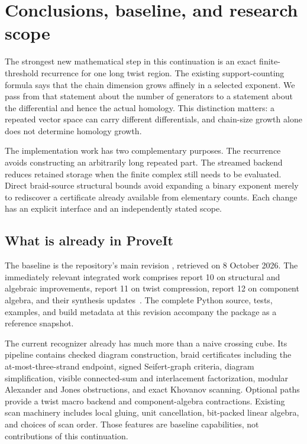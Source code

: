 \section{Conclusions, baseline, and research scope}\label{sec:scope}

The strongest new mathematical step in this continuation is an exact
finite-threshold recurrence for one long twist region. The existing
support-counting formula says that the chain dimension grows affinely in a
selected exponent. We pass from that statement about the number of
generators to a statement about the differential and hence the actual
homology. This distinction matters: a repeated vector space can carry
different differentials, and chain-size growth alone does not determine
homology growth.

The implementation work has two complementary purposes. The recurrence
avoids constructing an arbitrarily long repeated part. The streamed backend
reduces retained storage when the finite complex still needs to be evaluated.
Direct braid-source structural bounds avoid expanding a binary exponent
merely to rediscover a certificate already available from elementary counts.
Each change has an explicit interface and an independently stated scope.

\subsection{What is already in ProveIt}

The baseline is the repository's main revision
, retrieved on 8 October 2026.
The immediately relevant integrated work comprises report 10 on structural
and algebraic improvements, report 11 on twist compression, report 12 on
component algebra, and their synthesis updates~\cite{repo}.
The complete  Python source, tests, examples, and build metadata
at this revision accompany the package as a reference snapshot.

The current recognizer already has much more than a naive crossing cube.
Its pipeline contains checked diagram construction, braid certificates
including the at-most-three-strand endpoint, signed Seifert-graph criteria,
diagram simplification, visible connected-sum and interlacement
factorization, modular Alexander and Jones obstructions, and exact
Khovanov scanning. Optional paths provide a twist macro backend and
component-algebra contractions. Existing scan machinery includes local
gluing, unit cancellation, bit-packed linear algebra, and choices of scan
order. Those features are baseline capabilities, not contributions of this
continuation.

